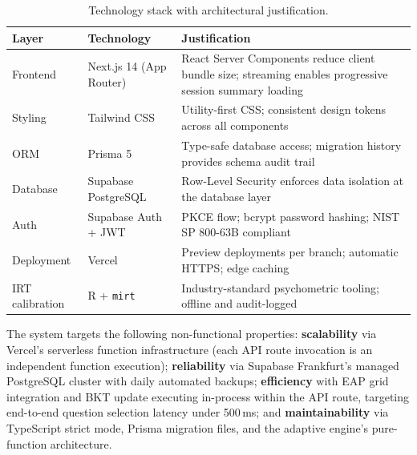 \begin{table}[H]
\centering
\caption{Technology stack with architectural justification.}
\label{tab:tech_stack}
\renewcommand{\arraystretch}{1.25}
\begin{tabularx}{\textwidth}{llX}
\toprule
\textbf{Layer} & \textbf{Technology} & \textbf{Justification} \\
\midrule
Frontend & Next.js 14 (App Router) &
  React Server Components reduce client bundle size; streaming enables
  progressive session summary loading \\
Styling & Tailwind CSS &
  Utility-first CSS; consistent design tokens across all components \\
ORM & Prisma 5 &
  Type-safe database access; migration history provides schema audit trail \\
Database & Supabase PostgreSQL &
  Row-Level Security enforces data isolation at the database layer \\
Auth & Supabase Auth + JWT &
  PKCE flow; bcrypt password hashing; NIST SP 800-63B compliant \\
Deployment & Vercel &
  Preview deployments per branch; automatic HTTPS; edge caching \\
IRT calibration & R + \texttt{mirt} &
  Industry-standard psychometric tooling; offline and audit-logged \\
\bottomrule
\end{tabularx}
\end{table}

The system targets the following non-functional properties: \textbf{scalability}
via Vercel's serverless function infrastructure (each API route invocation is
an independent function execution); \textbf{reliability} via Supabase Frankfurt's
managed PostgreSQL cluster with daily automated backups; \textbf{efficiency}
with EAP grid integration and BKT update executing in-process within the API
route, targeting end-to-end question selection latency under 500\,ms; and
\textbf{maintainability} via TypeScript strict mode, Prisma migration files,
and the adaptive engine's pure-function architecture.

